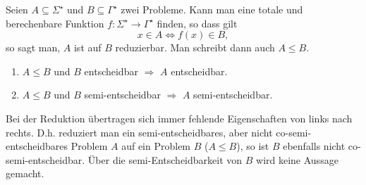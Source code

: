 Seien $A\subseteq \Sigma^\star$ und $B\subseteq \Gamma^\star$ zwei Probleme. Kann man eine totale und berechenbare Funktion $f:\Sigma^\star\rightarrow\Gamma^\star$ finden, so dass gilt
\begin{equation*}
	x\in A\Leftrightarrow f(x)\in B,
\end{equation*}
so sagt man, $A$ ist auf $B$ reduzierbar.
Man schreibt dann auch $A\leq B$.

\begin{enumerate}
	\item $A\leq B$ und $B$ entscheidbar $\Rightarrow$ $A$ entscheidbar.
	\item $A\leq B$ und $B$ semi-entscheidbar $\Rightarrow$ $A$ semi-entscheidbar.
\end{enumerate}

Bei der Reduktion übertragen sich immer fehlende Eigenschaften von links nach rechts. D.h. reduziert man ein semi-entscheidbares, aber nicht co-semi-entscheidbares Problem $A$ auf ein Problem $B$ ($A\leq B$), so ist $B$ ebenfalls nicht co-semi-entscheidbar. Über die semi-Entscheidbarkeit von $B$ wird keine Aussage gemacht.
